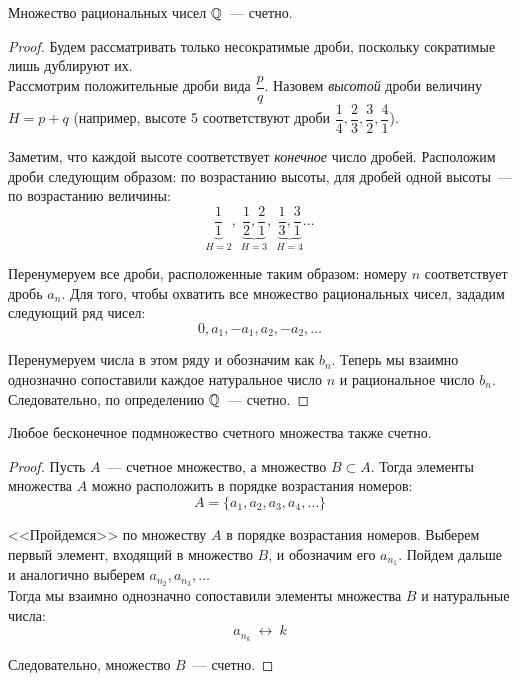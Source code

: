 
\begin{theorem}
Множество рациональных чисел \(\mathbb{Q}\)~--- счетно.

\begin{proof}
Будем рассматривать только несократимые дроби,
поскольку сократимые лишь дублируют их. \\

Рассмотрим положительные дроби вида \(\dfrac{p}{q}\). Назовем \textit{высотой}
дроби величину \(H = p+q\) (например, высоте 5 соответствуют дроби
\(\dfrac{1}{4}, \dfrac{2}{3}, \dfrac{3}{2}, \dfrac{4}{1}\)).

Заметим, что каждой высоте соответствует \textit{конечное} число дробей.
Расположим дроби следующим образом: по возрастанию высоты,
для дробей одной высоты~--- по возрастанию величины:
\[
\underbrace{\frac{1}{1}}_{H=2},~ \underbrace{\frac{1}{2}, \frac{2}{1}}_{H=3},
~\underbrace{\frac{1}{3},\frac{3}{1}}_{H=4}\dots
\]

Перенумеруем все дроби, расположенные таким образом:
номеру \(n\) соответствует дробь \(a_{n}\).
Для того, чтобы охватить все множество рациональных чисел, зададим
следующий ряд чисел:
\[
0, a_{1}, -a_{1}, a_{2}, -a_{2}, \dots
\]

Перенумеруем числа в этом ряду и обозначим как \(b_{n}\).
Теперь мы взаимно однозначно сопоставили
каждое натуральное число \(n\) и рациональное число \(b_{n}\).
Следовательно, по определению \(\mathbb{Q}\)~--- счетно.
\end{proof}
\end{theorem}

\begin{lemma}
Любое бесконечное подмножество счетного множества также счетно.

\begin{proof}
Пусть \(A\)~--- счетное множество, а множество \(B\subset A\).
Тогда элементы множества \(A\) можно расположить в порядке возрастания номеров:
\[
A = \{a_{1}, a_{2}, a_{3}, a_{4}, \dots\}
\]

<<Пройдемся>> по множеству \(A\) в порядке возрастания номеров.
Выберем первый элемент, входящий в множество \(B\), и обозначим его \(a_{n_{1}}\).
Пойдем дальше и аналогично выберем \(a_{n_{2}},a_{n_{3}},\dots\)\\
Тогда мы взаимно однозначно сопоставили элементы множества \(B\) и натуральные числа:
\[
a_{n_{k}} ~ \longleftrightarrow ~ k
\]

Следовательно, множество \(B\)~--- счетно.
\end{proof}
\end{lemma}

